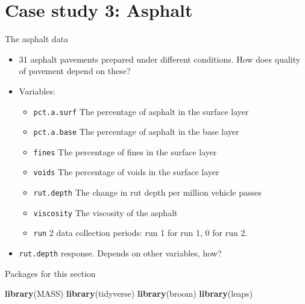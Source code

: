 \documentclass[ignorenonframetext,]{beamer}
\newenvironment{Shaded}{\begin{snugshade}}{\end{snugshade}}
\newcommand{\KeywordTok}[1]{\textcolor[rgb]{0.13,0.29,0.53}{\textbf{#1}}}
\newcommand{\NormalTok}[1]{#1}
\providecommand{\tightlist}{%
  \setlength{\itemsep}{0pt}\setlength{\parskip}{0pt}}
\begin{document}
\hypertarget{case-study-3-asphalt}{%
\section{Case study 3: Asphalt}\label{case-study-3-asphalt}}

\begin{frame}[fragile]{The asphalt data}
\protect\hypertarget{the-asphalt-data}{}

\begin{itemize}
\tightlist
\item
  31 asphalt pavements prepared under different conditions. How does
  quality of pavement depend on these?
\item
  Variables:

  \begin{itemize}
  \tightlist
  \item
    \texttt{pct.a.surf} The percentage of asphalt in the surface layer
  \item
    \texttt{pct.a.base} The percentage of asphalt in the base layer
  \item
    \texttt{fines} The percentage of fines in the surface layer
  \item
    \texttt{voids} The percentage of voids in the surface layer
  \item
    \texttt{rut.depth} The change in rut depth per million vehicle
    passes
  \item
    \texttt{viscosity} The viscosity of the asphalt
  \item
    \texttt{run} 2 data collection periods: run 1 for run 1, 0 for run
    2.
  \end{itemize}
\item
  \texttt{rut.depth} response. Depends on other variables, how?
\end{itemize}

\end{frame}

\begin{frame}[fragile]{Packages for this section}
\protect\hypertarget{packages-for-this-section-6}{}

\begin{Shaded}
\begin{Highlighting}[]
\KeywordTok{library}\NormalTok{(MASS)}
\KeywordTok{library}\NormalTok{(tidyverse)}
\KeywordTok{library}\NormalTok{(broom)}
\KeywordTok{library}\NormalTok{(leaps)}
\end{Highlighting}
\end{Shaded}

\end{frame}
\end{document}
